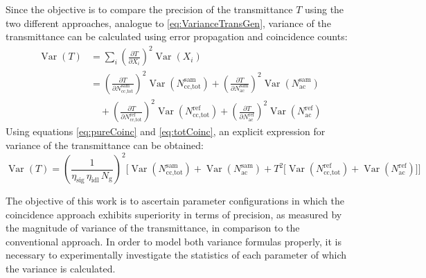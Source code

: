 Since the objective is to compare the precision of the transmittance $T$ using the two different approaches, analogue to \autoref{eq:VarianceTransGen}, variance of the transmittance can be calculated using error propagation and coincidence counts:
\begin{equation}
	\begin{aligned}
		\operatorname{Var}(T) 
		&= \sum_{i} \left( \frac{\partial T}{\partial X_i} \right)^{2} 
		\operatorname{Var}\!\left(X_i\right) \\[0.5em]
		&= \left( \frac{\partial T}{\partial N_{\text{cc,tot}}^{\text{sam}}} \right)^{2} 
		\operatorname{Var}\!\left(N_{\text{cc,tot}}^{\text{sam}}\right)
		+ \left( \frac{\partial T}{\partial N_{\text{ac}}^{\text{sam}}} \right)^{2} 
		\operatorname{Var}\!\left(N_{\text{ac}}^{\text{sam}}\right) \\[0.5em]
		&\quad + \left( \frac{\partial T}{\partial N_{\text{cc,tot}}^{\text{ref}}} \right)^{2} 
		\operatorname{Var}\!\left(N_{\text{cc,tot}}^{\text{ref}}\right)
		+ \left( \frac{\partial T}{\partial N_{\text{ac}}^{\text{ref}}} \right)^{2} 
		\operatorname{Var}\!\left(N_{\text{ac}}^{\text{ref}}\right)
	\end{aligned}
	\label{eq:VarianceTransGenCoinc}
\end{equation}
Using equations \ref{eq:pureCoinc} and \ref{eq:totCoinc}, an explicit expression for variance of the transmittance can be obtained:
 \begin{equation}
 	\operatorname{Var}(T) 
 	= \left( \frac{1}{\eta_{\text{sig}}\,\eta_{\text{idl}}\,N_{\mathrm{g}}} \right)^{2}
 	\Bigg[
 	\operatorname{Var}\!\left(N_{\text{cc,tot}}^{\text{sam}}\right) 
 	+ \operatorname{Var}\!\left(N_{\text{ac}}^{\text{sam}}\right) 
 	+ T^{2} \Big[ 
 	\operatorname{Var}\!\left(N_{\text{cc,tot}}^{\text{ref}}\right) 
 	+ \operatorname{Var}\!\left(N_{\text{ac}}^{\text{ref}}\right) 
 	\Big]
 	\Bigg]
 	\label{eq:VarianceTransExplCoinc}
 \end{equation}
 
The objective of this work is to ascertain parameter configurations in which the coincidence approach exhibits superiority in terms of precision, as measured by the magnitude of variance of the transmittance, in comparison to the conventional approach. In order to model both variance formulas properly, it is necessary to experimentally investigate the statistics of each parameter of which the variance is calculated.
